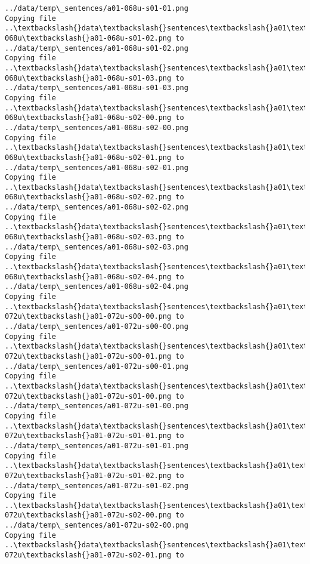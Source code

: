 \documentclass[11pt]{article}
\begin{document}
\begin{Verbatim}[commandchars=\\\{\}]
../data/temp\_sentences/a01-068u-s01-01.png
Copying file ..\textbackslash{}data\textbackslash{}sentences\textbackslash{}a01\textbackslash{}a01-068u\textbackslash{}a01-068u-s01-02.png to
../data/temp\_sentences/a01-068u-s01-02.png
Copying file ..\textbackslash{}data\textbackslash{}sentences\textbackslash{}a01\textbackslash{}a01-068u\textbackslash{}a01-068u-s01-03.png to
../data/temp\_sentences/a01-068u-s01-03.png
Copying file ..\textbackslash{}data\textbackslash{}sentences\textbackslash{}a01\textbackslash{}a01-068u\textbackslash{}a01-068u-s02-00.png to
../data/temp\_sentences/a01-068u-s02-00.png
Copying file ..\textbackslash{}data\textbackslash{}sentences\textbackslash{}a01\textbackslash{}a01-068u\textbackslash{}a01-068u-s02-01.png to
../data/temp\_sentences/a01-068u-s02-01.png
Copying file ..\textbackslash{}data\textbackslash{}sentences\textbackslash{}a01\textbackslash{}a01-068u\textbackslash{}a01-068u-s02-02.png to
../data/temp\_sentences/a01-068u-s02-02.png
Copying file ..\textbackslash{}data\textbackslash{}sentences\textbackslash{}a01\textbackslash{}a01-068u\textbackslash{}a01-068u-s02-03.png to
../data/temp\_sentences/a01-068u-s02-03.png
Copying file ..\textbackslash{}data\textbackslash{}sentences\textbackslash{}a01\textbackslash{}a01-068u\textbackslash{}a01-068u-s02-04.png to
../data/temp\_sentences/a01-068u-s02-04.png
Copying file ..\textbackslash{}data\textbackslash{}sentences\textbackslash{}a01\textbackslash{}a01-072u\textbackslash{}a01-072u-s00-00.png to
../data/temp\_sentences/a01-072u-s00-00.png
Copying file ..\textbackslash{}data\textbackslash{}sentences\textbackslash{}a01\textbackslash{}a01-072u\textbackslash{}a01-072u-s00-01.png to
../data/temp\_sentences/a01-072u-s00-01.png
Copying file ..\textbackslash{}data\textbackslash{}sentences\textbackslash{}a01\textbackslash{}a01-072u\textbackslash{}a01-072u-s01-00.png to
../data/temp\_sentences/a01-072u-s01-00.png
Copying file ..\textbackslash{}data\textbackslash{}sentences\textbackslash{}a01\textbackslash{}a01-072u\textbackslash{}a01-072u-s01-01.png to
../data/temp\_sentences/a01-072u-s01-01.png
Copying file ..\textbackslash{}data\textbackslash{}sentences\textbackslash{}a01\textbackslash{}a01-072u\textbackslash{}a01-072u-s01-02.png to
../data/temp\_sentences/a01-072u-s01-02.png
Copying file ..\textbackslash{}data\textbackslash{}sentences\textbackslash{}a01\textbackslash{}a01-072u\textbackslash{}a01-072u-s02-00.png to
../data/temp\_sentences/a01-072u-s02-00.png
Copying file ..\textbackslash{}data\textbackslash{}sentences\textbackslash{}a01\textbackslash{}a01-072u\textbackslash{}a01-072u-s02-01.png to

\end{Verbatim}
\end{document}
